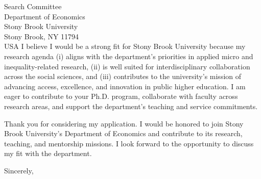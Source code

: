 \documentclass[11pt,letterpaper]{letter}
\begin{document}
\begin{letter}{Search Committee \\
Department of Economics \\
Stony Brook University \\
Stony Brook, NY 11794 \\ USA}
I believe I would be a strong fit for Stony Brook University because my research agenda (i) aligns with the department’s priorities in applied micro and inequality-related research, (ii) is well suited for interdisciplinary collaboration across the social sciences, and (iii) contributes to the university’s mission of advancing access, excellence, and innovation in public higher education. I am eager to contribute to your Ph.D. program, collaborate with faculty across research areas, and support the department’s teaching and service commitments.

Thank you for considering my application. I would be honored to join Stony Brook University’s Department of Economics and contribute to its research, teaching, and mentorship missions. I look forward to the opportunity to discuss my fit with the department.

\closing{Sincerely,}

\end{letter}
\end{document}
